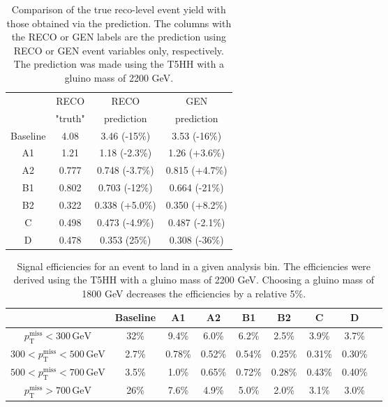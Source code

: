 \begin{table}[hbp!]
\centering
\caption[Comparison of the true reco-level event yield with those obtained via the prediction.]{
Comparison of the true reco-level event yield with those obtained via the prediction. The columns with the RECO or GEN labels are the prediction using RECO or GEN event variables only, respectively. The prediction was made using the T5HH  with a gluino mass of 2200 GeV.
}
\begin{tabular}{c | c c c}
\hline\hline
         & RECO     & RECO           & GEN\\
         & "truth"  & prediction     & prediction\\
\hline
Baseline & 4.08     & 3.46 (-15\%)   & 3.53 (-16\%)\\
A1       & 1.21     & 1.18 (-2.3\%)  & 1.26 (+3.6\%)\\
A2       & 0.777    & 0.748 (-3.7\%) & 0.815 (+4.7\%)\\
B1       & 0.802    & 0.703 (-12\%)  & 0.664 (-21\%)\\
B2       & 0.322    & 0.338 (+5.0\%) & 0.350 (+8.2\%)\\
C        & 0.498    & 0.473 (-4.9\%) & 0.487 (-2.1\%)\\
D        & 0.478    & 0.353 (25\%)   & 0.308 (-36\%)\\
\hline\hline
\end{tabular}
\label{tab:predclos}
\end{table}

\begin{table}[hbp!]
\centering
\caption[T5HH signal event efficiencies.]{
Signal efficiencies for an event to land in a given analysis bin.
The efficiencies were derived using the T5HH  with a gluino mass of 2200 GeV.
Choosing a gluino mass of 1800 GeV decreases the efficiencies by a relative 5\%.
}
\begin{tabular}{c | c c c c c c c c}
\hline
\hline
                                                            & Baseline & A1     & A2      & B1      & B2      & C       & D\\
\hline
$p_{\mathrm{T}}^{\mathrm{miss}}< 300\,\mathrm{GeV}$        & 32\%    & 9.4\%   & 6.0\%   & 6.2\%   & 2.5\%   & 3.9\%   & 3.7\% \\
$300 < p_{\mathrm{T}}^{\mathrm{miss}} < 500\,\mathrm{GeV}$  & 2.7\%   & 0.78\%  & 0.52\%  & 0.54\%  & 0.25\%  & 0.31\%  & 0.30\% \\
$500 < p_{\mathrm{T}}^{\mathrm{miss}} < 700\,\mathrm{GeV}$  & 3.5\%   & 1.0\%   & 0.65\%  & 0.72\%  & 0.28\%  & 0.43\%  & 0.40\% \\
$p_{\mathrm{T}}^{\mathrm{miss}} > 700\,\mathrm{GeV}$        & 26\%    & 7.6\%   & 4.9\%   & 5.0\%   & 2.0\%   & 3.1\%   & 3.0\% \\
\hline
\hline
\end{tabular}
\label{tab:sigeff}
\end{table}

